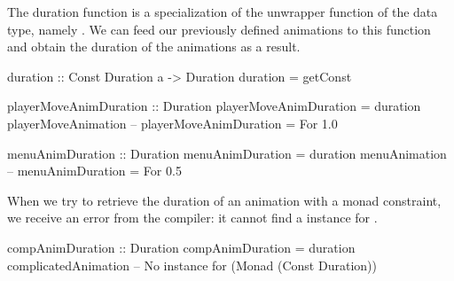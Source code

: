 The duration function is a specialization of the unwrapper function of the  data type, namely . We can feed our previously defined animations to this function and obtain the duration of the animations as a result.

\begin{code}
duration :: Const Duration a -> Duration
duration = getConst

playerMoveAnimDuration :: Duration
playerMoveAnimDuration = duration playerMoveAnimation
-- playerMoveAnimDuration = For 1.0

menuAnimDuration :: Duration
menuAnimDuration = duration menuAnimation
-- menuAnimDuration = For 0.5
\end{code}

When we try to retrieve the duration of an animation with a monad constraint, we receive an error from the compiler: it cannot find a  instance for .

\begin{spec}
compAnimDuration :: Duration
compAnimDuration = duration complicatedAnimation
-- No instance for (Monad (Const Duration))
\end{spec}
